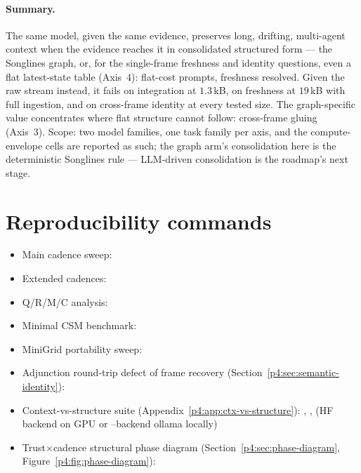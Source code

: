 \documentclass{article}
\begin{document}
\paragraph{Summary.}
The same model, given the same evidence, preserves long, drifting, multi-agent
context when the evidence reaches it in consolidated structured form ---
the Songlines graph, or, for the single-frame freshness and identity
questions, even a flat latest-state table (Axis~4): flat-cost prompts,
freshness resolved. Given the raw stream instead, it fails on integration at
$1.3$\,kB, on freshness at $19$\,kB with full ingestion, and on cross-frame
identity at every tested size. The graph-specific value concentrates where
flat structure cannot follow: cross-frame gluing (Axis~3). Scope: two model
families, one task family per axis, and the compute-envelope cells are
reported as such; the graph arm's consolidation here is the deterministic
Songlines rule --- LLM-driven consolidation is the roadmap's next stage.


\section{Reproducibility commands}
\label{p4:app:repro}

\begin{itemize}[leftmargin=16pt]
\item Main cadence sweep:
\item Extended cadences:
\item Q/R/M/C analysis:
\item Minimal CSM benchmark:
\item MiniGrid portability sweep:
\item Adjunction round-trip defect of frame recovery (Section~\ref{p4:sec:semantic-identity}):
\item Context-vs-structure suite (Appendix~\ref{p4:app:ctx-vs-structure}): , ,  (HF backend on GPU or --backend ollama locally)
\item Trust$\times$cadence structural phase diagram (Section~\ref{p4:sec:phase-diagram}, Figure~\ref{p4:fig:phase-diagram}):
\end{itemize}
\end{document}
